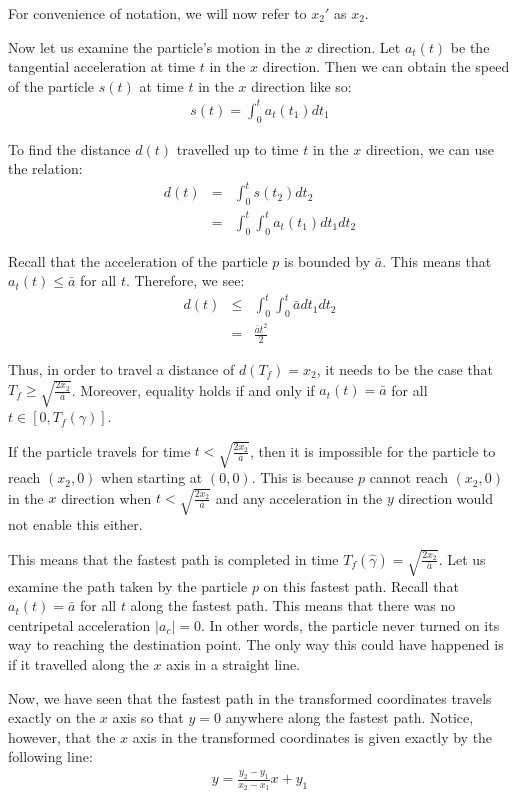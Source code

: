 For convenience of notation, we will now refer to $x_2'$ as $x_2$.

Now let us examine the particle's motion in the $x$ direction. Let $a_t(t)$ be the tangential acceleration at time $t$ in the $x$ direction. Then we can obtain the speed of the particle $s(t)$ at time $t$ in the $x$ direction like so:
\begin{eqnarray}
  s(t) = \int_0^t a_t(t_1) dt_1
\end{eqnarray}

To find the distance $d(t)$ travelled up to time $t$ in the $x$ direction, we can use the relation:
\begin{eqnarray}
  d(t) &=& \int_0^t s(t_2) dt_2 \\
       &=& \int_0^t \int_0^t a_t(t_1) dt_1 dt_2
\end{eqnarray}

Recall that the acceleration of the particle $p$ is bounded by $\bar{a}$. This means that $a_t(t) \leq \bar{a}$ for all $t$. Therefore, we see:
\begin{eqnarray}
  d(t) &\leq& \int_0^t \int_0^t \bar{a} dt_1 dt_2 \\
       &=& \frac{\bar{a} t^2}{2}
\end{eqnarray}

Thus, in order to travel a distance of $d(T_f) = x_2$, it needs to be the case that $T_f \geq \sqrt{\frac{2 x_2}{\bar{a}}}$. Moreover, equality holds if and only if $a_t(t) = \bar{a}$ for all $t \in [0, T_f(\gamma)]$.

If the particle travels for time $t < \sqrt{\frac{2 x_2}{\bar{a}}}$, then it is impossible for the particle to reach $(x_2, 0)$ when starting at $(0,0)$. This is because $p$ cannot reach $(x_2, 0)$ in the $x$ direction when $t < \sqrt{\frac{2 x_2}{\bar{a}}}$ and any acceleration in the $y$ direction would not enable this either.

This means that the fastest path is completed in time $T_f(\hat{\gamma}) = \sqrt{\frac{2 x_2}{\bar{a}}}$. Let us examine the path taken by the particle $p$ on this fastest path. Recall that $a_t(t) = \bar{a}$ for all $t$ along the fastest path. This means that there was no centripetal acceleration $|a_c| = 0$. In other words, the particle never turned on its way to reaching the destination point. The only way this could have happened is if it travelled along the $x$ axis in a straight line.

Now, we have seen that the fastest path in the transformed coordinates travels exactly on the $x$ axis so that $y = 0$ anywhere along the fastest path. Notice, however, that the $x$ axis in the transformed coordinates is given exactly by the following line:
\begin{eqnarray}
  y = \frac{y_2 - y_1}{x_2 - x_1} x + y_1
\end{eqnarray}

